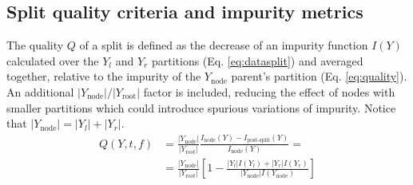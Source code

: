 
\subsection{Split quality criteria and impurity metrics}
\label{sec:criteria}

The quality $Q$ of a split is defined as the decrease of an impurity function $I(Y)$ calculated over the $Y_l$ and $Y_r$ partitions (Eq. \ref{eq:datasplit}) and averaged together, relative to the impurity of the $Y_\text{node}$ parent's partition (Eq. \ref{eq:quality}). An additional $|Y_\text{node}|/|Y_\text{root}|$ factor is included, reducing the effect of nodes with smaller partitions which could introduce spurious variations of impurity. Notice that $|Y_\text{node}|=|Y_l|+|Y_r|$.
%
\begin{equation}
    \begin{split}
    Q(Y, t, f)
        &=
            \frac{|Y_\text{node}|}{|Y_\text{root}|}
            \frac{I_\text{node}(Y)-I_{\text{post-split}}(Y)}{I_\text{node}(Y)} =\\
        &=
            \frac{|Y_\text{node}|}{|Y_\text{root}|}
            \left[
                1
                - \frac{|Y_l| I(Y_l)+ |Y_r|I(Y_r)}
                    {|Y_\text{node}|I(Y_\text{node})}
            \right]
    \end{split}
    \label{eq:quality}
\end{equation}

